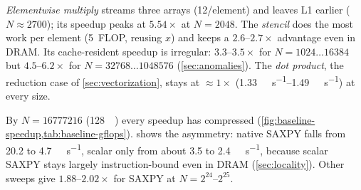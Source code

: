 \emph{Elementwise multiply} streams three arrays (\qty{12}{\byte}/element) and leaves L1 earlier
($N\approx\num{2700}$); its speedup peaks at $5.54\times$ at $N=\num{2048}$. The \emph{stencil} does
the most work per element (5~FLOP, reusing $x$) and keeps a $2.6$--$2.7\times$ advantage even in
DRAM. Its cache-resident speedup is irregular: $3.3$--$3.5\times$ for
$N=\num{1024}\ldots\num{16384}$ but $4.5$--$6.2\times$ for $N=\num{32768}\ldots\num{1048576}$
(\cref{sec:anomalies}). The \emph{dot product}, the reduction case of \cref{sec:vectorization},
stays at $\approx1\times$ (\qtyrange{1.33}{1.49}{\giga\flop\per\second}) at every size.

By $N=\num{16777216}$ (\qty{128}{\mebi\byte}) every speedup has compressed
(\cref{fig:baseline-speedup,tab:baseline-gflops}).  shows the
asymmetry: native SAXPY falls from \num{20.2} to \qty{4.7}{\giga\flop\per\second}, scalar only from
about \num{3.5} to \qty{2.4}{\giga\flop\per\second}, because scalar SAXPY stays largely
instruction-bound even in DRAM (\cref{sec:locality}). Other sweeps give $1.88\text{--}2.02\times$ for SAXPY at
$N=2^{24}$--$2^{25}$.

